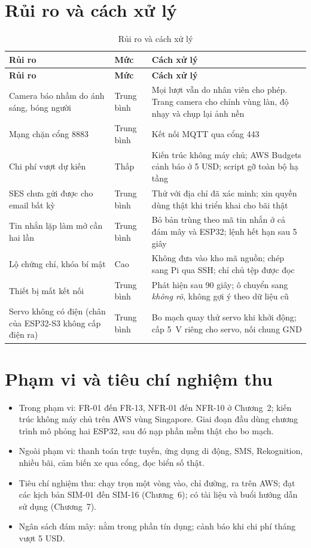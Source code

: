 \section{Rủi ro và cách xử lý}

\begin{longtable}{@{}P{4.4cm}P{1.6cm}P{8.1cm}@{}}
\caption{Rủi ro và cách xử lý}\label{tab:ruiro}\\
\toprule
\textbf{Rủi ro} & \textbf{Mức} & \textbf{Cách xử lý} \\ \midrule
\endfirsthead
\toprule
\textbf{Rủi ro} & \textbf{Mức} & \textbf{Cách xử lý} \\ \midrule
\endhead
Camera báo nhầm do ánh sáng, bóng người & Trung bình & Mọi lượt vẫn do nhân viên cho phép. Trang camera cho chỉnh vùng làn, độ nhạy và chụp lại ảnh nền \\
Mạng chặn cổng 8883 & Trung bình & Kết nối MQTT qua cổng 443 \\
Chi phí vượt dự kiến & Thấp & Kiến trúc không máy chủ; AWS Budgets cảnh báo ở 5 USD; script gỡ toàn bộ hạ tầng \\
SES chưa gửi được cho email bất kỳ & Trung bình & Thử với địa chỉ đã xác minh; xin quyền dùng thật khi triển khai cho bãi thật \\
Tin nhắn lặp làm mở cần hai lần & Trung bình & Bỏ bản trùng theo mã tin nhắn ở cả đám mây và ESP32; lệnh hết hạn sau 5 giây \\
Lộ chứng chỉ, khóa bí mật & Cao & Không đưa vào kho mã nguồn; chép sang Pi qua SSH; chỉ chủ tệp được đọc \\
Thiết bị mất kết nối & Trung bình & Phát hiện sau 90 giây; ô chuyển sang \emph{không rõ}, không gợi ý theo dữ liệu cũ \\
Servo không có điện (chân  của ESP32-S3 không cấp điện ra) & Trung bình & Bo mạch quay thử servo khi khởi động; cấp 5~V riêng cho servo, nối chung GND \\
\bottomrule
\end{longtable}

\section{Phạm vi và tiêu chí nghiệm thu}
\label{sec:nghiemthu}

\begin{itemize}
  \item Trong phạm vi: FR-01 đến FR-13, NFR-01 đến NFR-10 ở Chương~2; kiến trúc không máy chủ trên AWS vùng Singapore. Giai đoạn đầu dùng chương trình mô phỏng hai ESP32, sau đó nạp phần mềm thật cho bo mạch.
  \item Ngoài phạm vi: thanh toán trực tuyến, ứng dụng di động, SMS, Rekognition, nhiều bãi, cảm biến xe qua cổng, đọc biển số thật.
  \item Tiêu chí nghiệm thu: chạy trọn một vòng vào, chỉ đường, ra trên AWS; đạt các kịch bản SIM-01 đến SIM-16 (Chương~6); có tài liệu và buổi hướng dẫn sử dụng (Chương~7).
  \item Ngân sách đám mây: nằm trong phần tín dụng; cảnh báo khi chi phí tháng vượt 5 USD.
\end{itemize}
